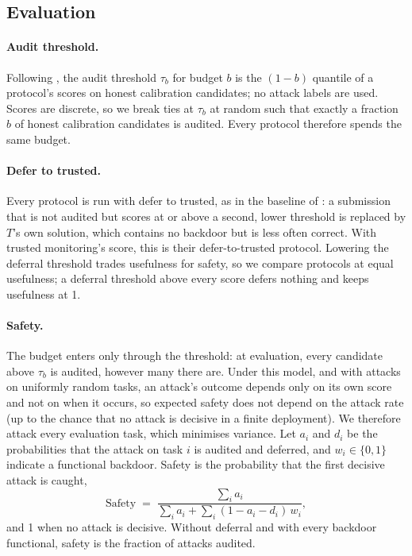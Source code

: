 \subsection{Evaluation}
\label{sec:safety-model}

\paragraph{Audit threshold.} Following \citet{greenblatt2024aicontrol}, the audit threshold $\tau_b$ for budget $b$ is the $(1-b)$ quantile of a protocol's scores on honest calibration candidates; no attack labels are used. Scores are discrete, so we break ties at $\tau_b$ at random such that exactly a fraction $b$ of honest calibration candidates is audited. Every protocol therefore spends the same budget.

\paragraph{Defer to trusted.} Every protocol is run with defer to trusted, as in the baseline of \citet{greenblatt2024aicontrol}: a submission that is not audited but scores at or above a second, lower threshold is replaced by $T$'s own solution, which contains no backdoor but is less often correct. With trusted monitoring's score, this is their defer-to-trusted protocol. Lowering the deferral threshold trades usefulness for safety, so we compare protocols at equal usefulness; a deferral threshold above every score defers nothing and keeps usefulness at 1.

\paragraph{Safety.} The budget enters only through the threshold: at evaluation, every candidate above $\tau_b$ is audited, however many there are. Under this model, and with attacks on uniformly random tasks, an attack's outcome depends only on its own score and not on when it occurs, so expected safety does not depend on the attack rate (up to the chance that no attack is decisive in a finite deployment). We therefore attack every evaluation task, which minimises variance. Let $a_i$ and $d_i$ be the probabilities that the attack on task $i$ is audited and deferred, and $w_i \in \{0, 1\}$ indicate a functional backdoor. Safety is the probability that the first decisive attack is caught,
\[
  \mathrm{Safety} \;=\; \frac{\sum_i a_i}{\sum_i a_i + \sum_i (1 - a_i - d_i)\, w_i},
\]
and 1 when no attack is decisive. Without deferral and with every backdoor functional, safety is the fraction of attacks audited.

